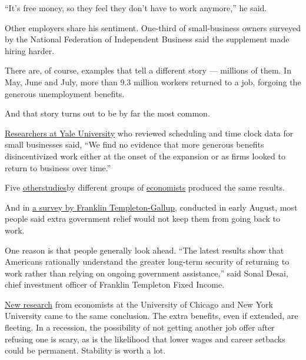 ``It's free money, so they feel they don't have to work anymore,'' he
said.

Other employers share his sentiment. One-third of small-business owners
surveyed by the National Federation of Independent Business said the
supplement made hiring harder.

There are, of course, examples that tell a different story --- millions
of them. In May, June and July, more than 9.3 million workers returned
to a job, forgoing the generous unemployment benefits.

And that story turns out to be by far the most common.

\href{https://news.yale.edu/2020/07/27/yale-study-finds-expanded-jobless-benefits-did-not-reduce-employment}{Researchers
at Yale University} who reviewed scheduling and time clock data for
small businesses said, ``We find no evidence that more generous benefits
disincentivized work either at the onset of the expansion or as firms
looked to return to business over time.''

Five
\href{https://www.nber.org/papers/w27613.pdf}{other}\href{https://www.jec.senate.gov/public/_cache/files/d995d820-20d6-4a24-b93f-b1a16ce2b0d2/studies-show-600-weekly-enhanced-unemployment-benefit-has-not-slowed-labor-market-recovery-final.pdf}{studies}by
different groups of
\href{https://papers.ssrn.com/sol3/papers.cfm?abstract_id=3664265}{economists}
produced the same results.

And in
\href{https://www.nytimes3xbfgragh.onion/live/2020/09/01/business/stock-market-today-coronavirus/extra-unemployment-pay-deters-few-from-seeking-work-a-survey-finds}{a
survey by Franklin Templeton-Gallup}, conducted in early August, most
people said extra government relief would not keep them from going back
to work.

One reason is that people generally look ahead. ``The latest results
show that Americans rationally understand the greater long-term security
of returning to work rather than relying on ongoing government
assistance,'' said Sonal Desai, chief investment officer of Franklin
Templeton Fixed Income.

\href{https://bfi.uchicago.edu/working-paper/2020-112/}{New research}
from economists at the University of Chicago and New York University
came to the same conclusion. The extra benefits, even if extended, are
fleeting. In a recession, the possibility of not getting another job
offer after refusing one is scary, as is the likelihood that lower wages
and career setbacks could be permanent. Stability is worth a lot.


